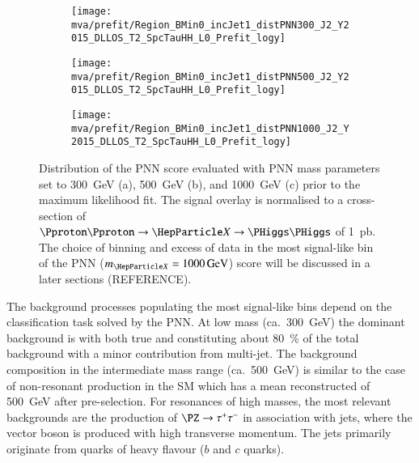 \begin{figure}[htbp]
  \centering

  \begin{subfigure}[t]{.49\textwidth}
    \texttt{[image: mva/prefit/Region\_BMin0\_incJet1\_distPNN300\_J2\_Y2015\_DLLOS\_T2\_SpcTauHH\_L0\_Prefit\_logy]}
    \caption{}
    \label{fig:pnn_score_prefit_300}
  \end{subfigure}\hfill%
  \begin{subfigure}[t]{.49\textwidth}
    \centering
    \texttt{[image: mva/prefit/Region\_BMin0\_incJet1\_distPNN500\_J2\_Y2015\_DLLOS\_T2\_SpcTauHH\_L0\_Prefit\_logy]}
    \caption{}
    \label{fig:pnn_score_prefit_500}
  \end{subfigure}

  \begin{subfigure}[t]{.49\textwidth}
    \centering
    \texttt{[image: mva/prefit/Region\_BMin0\_incJet1\_distPNN1000\_J2\_Y2015\_DLLOS\_T2\_SpcTauHH\_L0\_Prefit\_logy]}
    \caption{}
    \label{fig:pnn_score_prefit_1000}
  \end{subfigure}

  \caption{Distribution of the PNN score evaluated with PNN mass
    parameters set to \SI{300}{\GeV} (a), \SI{500}{\GeV} (b), and
    \SI{1000}{\GeV} (c) prior to the maximum likelihood fit.  The
    signal overlay is normalised to a cross-section of
    $\Pproton\Pproton \to \PX \to \HH$ of \SI{1}{\pico\barn}. The
    choice of binning and excess of data in the most signal-like bin
    of the PNN ($\mX = \SI{1000}{\GeV}$) score will be discussed in a
    later sections (REFERENCE).}
  \label{fig:pnn_score_prefit}
\end{figure}

The background processes populating the most signal-like bins depend
on the classification task solved by the PNN. At low mass
(ca.~\SI{300}{\GeV}) the dominant background is \ttbar with both true
and \faketauhadvis constituting about \SI{80}{\percent} of the total
background with a minor contribution from multi-jet.  The background
composition in the intermediate mass range (ca.~\SI{500}{\GeV}) is
similar to the case of non-resonant \HH production in the SM which has
a mean reconstructed \mHH of \SI{500}{\GeV} after pre-selection.  For
resonances of high masses, the most relevant backgrounds are the
production of $\PZ \to \tautau$ in association with jets, where the
vector boson is produced with high transverse momentum. The jets
primarily originate from quarks of heavy flavour ($b$ and $c$ quarks).

